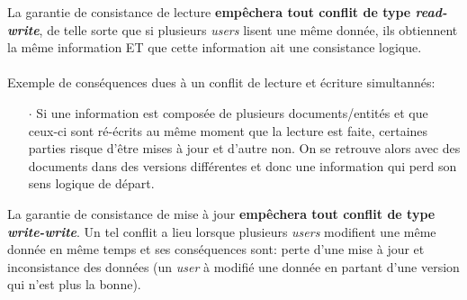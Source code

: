 \item{}
{\faux}
{
La garantie de consistance de lecture \textbf{empêchera tout conflit de type \textit{read-write}}, de telle sorte que si plusieurs \textit{users} lisent une même donnée, ils obtiennent la même information ET que cette information ait une consistance logique.

\paragraph{}
Exemple de conséquences dues à un conflit de lecture et écriture simultannés:
\begin{itemize}
\item[$\cdot$]Si une information est composée de plusieurs documents/entités et que ceux-ci sont ré-écrits au même moment que la lecture est faite, certaines parties risque d'être mises à jour et d'autre non. On se retrouve alors avec des documents dans des versions différentes et donc une information qui perd son sens logique de départ.
\end{itemize}
}


\item{}
{\faux}
{
La garantie de consistance de mise à jour \textbf{empêchera tout conflit de type \textit{write-write}}. Un tel conflit a lieu lorsque plusieurs \textit{users} modifient une même donnée en même temps et ses conséquences sont: perte d'une mise à jour et inconsistance des données (un \textit{user} à modifié une donnée en partant d'une version qui n'est plus la bonne).
}


